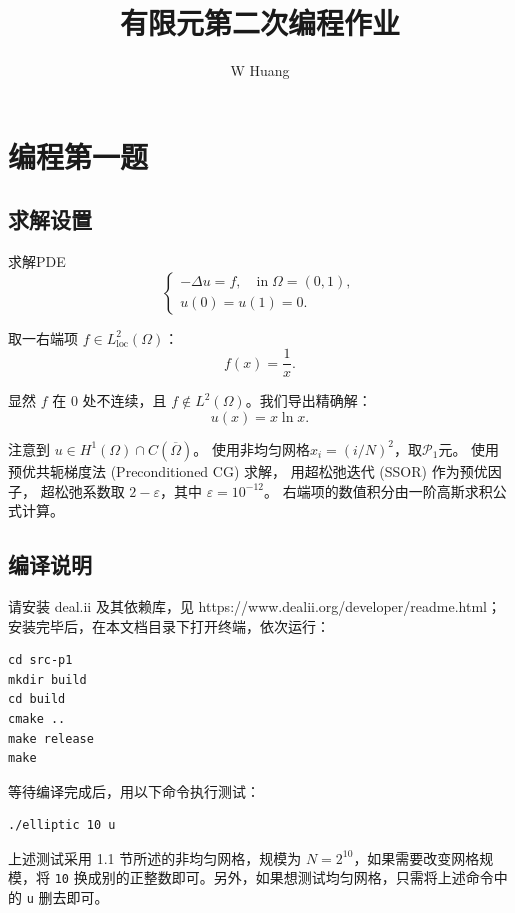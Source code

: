\documentclass[lang=cn,11pt,a4paper]{elegantpaper}
\title{有限元第二次编程作业}
\author{W Huang}
\date{\zhtoday}
\begin{document}
\maketitle

\section{编程第一题}

\subsection{求解设置}

求解PDE
\begin{equation}
    \left\{
        \begin{array}{l}
            -\Delta u = f,\quad \text{in}\;\Omega=(0,1),\\
            u(0) = u(1) = 0.
        \end{array}
    \right.
\end{equation}

取一右端项 $f\in L_\text{loc}^2(\Omega)$：
\begin{equation}
    f(x)=\frac{1}{x}.
\end{equation}

显然 $f$ 在 $0$ 处不连续，且 $f\notin L^2(\Omega)$。我们导出精确解：
\begin{equation}
    u(x)=x\ln x.
\end{equation}

注意到 $u\in H^1(\Omega)\cap C(\overline{\Omega})$。
使用非均匀网格$x_i=(i/N)^2$，取$\mathcal{P}_1$元。
使用预优共轭梯度法 (Preconditioned CG) 求解，
用超松弛迭代 (SSOR) 作为预优因子，
超松弛系数取 $2-\varepsilon$，其中 $\varepsilon=10^{-12}$。
右端项的数值积分由一阶高斯求积公式计算。

\subsection{编译说明}

请安装 deal.ii 及其依赖库，见 https://www.dealii.org/developer/readme.html；安装完毕后，在本文档目录下打开终端，依次运行：
\begin{lstlisting}
cd src-p1
mkdir build
cd build
cmake ..
make release
make
\end{lstlisting}
等待编译完成后，用以下命令执行测试：
\begin{lstlisting}
./elliptic 10 u
\end{lstlisting}
上述测试采用 1.1 节所述的非均匀网格，规模为 $N=2^{10}$，如果需要改变网格规模，将 \verb|10| 换成别的正整数即可。另外，如果想测试均匀网格，只需将上述命令中的 \verb|u| 删去即可。
\end{document}
